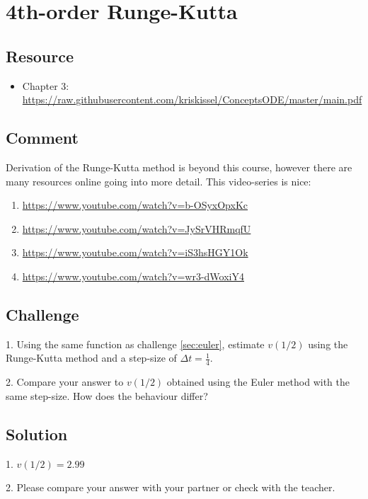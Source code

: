 \newpage
\section{4th-order Runge-Kutta}

\subsection*{Resource}
\begin{itemize}
    \item Chapter 3: \url{https://raw.githubusercontent.com/kriskissel/ConceptsODE/master/main.pdf}
\end{itemize}

\subsection*{Comment}
Derivation of the Runge-Kutta method is beyond this course, however there are many resources online going into more detail. This video-series is nice:
\begin{enumerate}
    \item \url{https://www.youtube.com/watch?v=b-OSyxOpxKc}
    \item \url{https://www.youtube.com/watch?v=JySrVHRmqfU}
    \item \url{https://www.youtube.com/watch?v=iS3hsHGY1Ok}
    \item \url{https://www.youtube.com/watch?v=wr3-dWoxiY4}
\end{enumerate}

\subsection*{Challenge}
1. Using the same function as challenge \ref{sec:euler}, estimate $v(1/2)$ using the Runge-Kutta method and a step-size of $\Delta t = \frac{1}{4}$.

2. Compare your answer to $v(1/2)$ obtained using the Euler method with the same step-size. How does the behaviour differ?

\subsection*{Solution}
1. $v(1/2) = 2.99$

2. Please compare your answer with your partner or check with the teacher.





